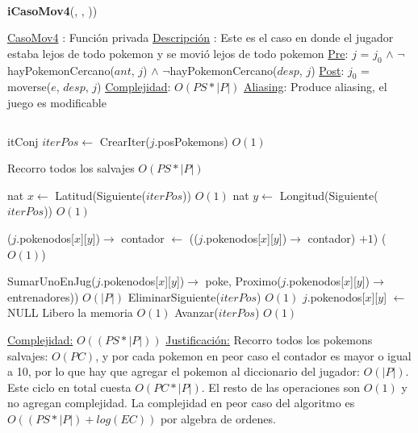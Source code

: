 \begin{Algoritmos}
$ $\newline
$ $\newline


{\textbf{iCasoMov4}(,  , ))}
\begin{algorithmic}[1]

\Statex \underline{CasoMov4} : Funci\'on privada 
\Statex \underline{Descripci\'on} : Este es el caso en donde el jugador estaba lejos de todo pokemon y se movi\'o lejos de todo pokemon
\Statex \underline{Pre}: $j$ = $j_0$ $\land$ $\neg$hayPokemonCercano($ant$, $j$) $\land$ $\neg$hayPokemonCercano($desp$, $j$) 
\Statex \underline{Post}: $j_0$ = moverse($e$, $desp$, $j$) 
\Statex \underline{Complejidad}: $O(PS *|P|)$ 
\Statex \underline{Aliasing}: Produce aliasing, el juego es modificable

$ $\newline


\State itConj $iterPos \gets$ CrearIter($j$.posPokemons) \Comment $O(1)$ 

 Recorro todos los salvajes \Comment $O(PS * |P|)$

  \State nat $x \gets$ Latitud(Siguiente($iterPos$)) \Comment $O(1)$
  \State nat $y \gets$ Longitud(Siguiente($iterPos$)) \Comment $O(1)$   
  
  \State ($j$.pokenodos[$x$][$y$])$\rightarrow$ contador $\gets$ (($j$.pokenodos[$x$][$y$])$\rightarrow$ contador) $+ 1$) \Comment($O(1)$)
  
    \State SumarUnoEnJug($j$.pokenodos[$x$][$y$])$\rightarrow$ poke, Proximo($j$.pokenodos[$x$][$y$])$\rightarrow$ entrenadores)) \Comment $O(|P|)$
    \State EliminarSiguiente($iterPos$) \Comment $O(1)$
    \State $j$.pokenodos[$x$][$y$] $\gets$ NULL \Comment Libero la memoria $O(1)$
  \Else 
    \State Avanzar($iterPos$) \Comment $O(1)$ 
  \EndIf

\EndWhile 



\medskip
\Statex \underline{Complejidad:} $O((PS *|P|))$ 
\Statex \underline{Justificaci\'on:} Recorro todos los pokemons salvajes: $O(PC)$, y por cada pokemon en peor caso el contador es mayor o igual a 10, por lo que hay que agregar el pokemon al diccionario del jugador: $O(|P|)$. Este ciclo en total cuesta $O(PC*|P|)$. El resto de las operaciones son $O(1)$ y no agregan complejidad. La complejidad en peor caso del algoritmo es $O((PS *|P|) + log(EC))$ por algebra de ordenes.
\end{algorithmic}


\end{Algoritmos}
